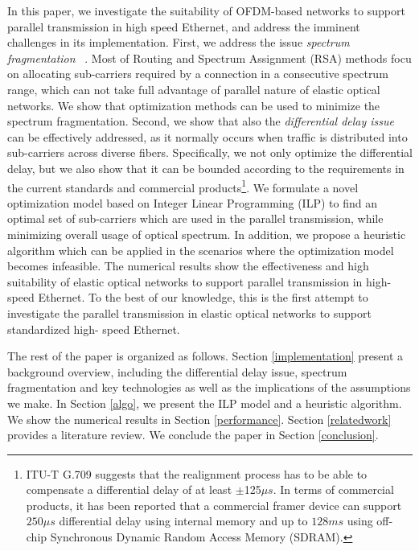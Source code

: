 \documentclass[conference]{IEEEtran}
\begin{document}
 
\par In this paper, we investigate the suitability of OFDM-based networks to support parallel transmission in high speed 
Ethernet, and address the imminent challenges in its implementation. First, we address the issue \emph{spectrum 
fragmentation} ~\cite{Chen:infocom:2013}\cite{Chen:ICC:2013}.  Most of Routing and Spectrum Assignment 
(RSA) methods focu on allocating sub-carriers required by a connection in a consecutive spectrum range, which can not take full advantage of parallel nature of elastic optical networks. We show that optimization methods can be used to 
minimize the  spectrum fragmentation. Second, we show that also the \emph{differential delay issue} can be 
effectively addressed, as it normally occurs when traffic is distributed into sub-carriers across diverse fibers. 
Specifically, we not only optimize the differential delay, but we also show that it can be bounded according to the 
requirements in the current standards and commercial products\footnote{ITU-T G.709 \cite{ITU-T:G.709} suggests 
that the realignment process has to be able to compensate a differential delay of at least $\pm$125$\mu s$. In terms of 
commercial products, it has been reported that a commercial framer device can support $250 \mu s$ differential delay 
using internal memory and up to $128ms$ using off-chip Synchronous Dynamic Random Access Memory 
(SDRAM)\cite{cisco}\cite{Intel:datasheet}.}.  We formulate a novel optimization model based on Integer Linear 
Programming (ILP) to find an optimal set of sub-carriers which are used in the parallel transmission, while minimizing 
overall usage of optical spectrum. In addition, we propose a heuristic algorithm which can be applied in the scenarios  
where the optimization model becomes infeasible.    The numerical results show the effectiveness and high suitability 
of elastic optical networks to support parallel transmission in high-speed Ethernet.  To the best of our knowledge, this 
is the first attempt to investigate the parallel transmission in elastic optical networks to support standardized high-
speed Ethernet.

\par The rest of the paper is organized as follows. Section \ref{implementation} present a background overview, 
 including the differential delay issue, spectrum fragmentation and  key  technologies  as well as the implications of the assumptions we make. In Section \ref{algo}, we present the ILP model  and a heuristic algorithm. We show the numerical results in  Section \ref{performance}. Section \ref{relatedwork} provides a literature review.   We conclude the paper in  Section \ref{conclusion}. 
\end{document}
